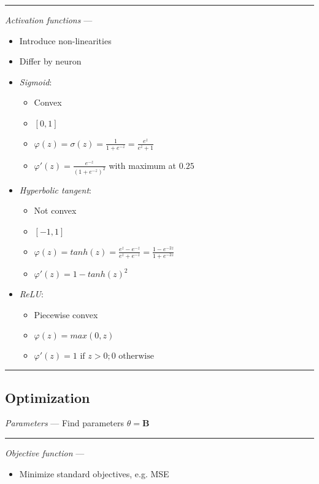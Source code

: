 {\color{lightgray}\hrule height 0.001mm}

\emph{Activation functions} --- 
\begin{itemize}
    \item Introduce non-linearities
    \item Differ by neuron
    \item \emph{Sigmoid}:
    \begin{itemize}
        \item Convex
        \item $[0,1]$
        \item $\varphi(z) = \sigma(z) =  \frac{1}{1+e^{-z}} = \frac{e^z}{e^z + 1}$
        \item $\varphi'(z) = \frac{e^{-z}}{(1+e^{-z})^2}$ with maximum at $0.25$
    \end{itemize}
    \item \emph{Hyperbolic tangent}:
    \begin{itemize}
        \item Not convex
        \item $[-1,1]$
        \item $\varphi(z) = tanh(z) =  \frac{e^z - e^{-z}}{e^z + e^{-z}} = \frac{1 - e^{-2z}}{1 + e^{-2z}}$
        \item $\varphi'(z) = 1-tanh(z)^2$
    \end{itemize}
    \item \emph{ReLU}:
    \begin{itemize}
        \item Piecewise convex
        \item $\varphi(z) = max(0,z)$
        \item $\varphi'(z) = 1 \textrm{ if } z > 0; 0 \textrm { otherwise}$
    \end{itemize}
\end{itemize}

{\color{black}\hrule height 0.001mm}

\subsection*{Optimization}
\emph{Parameters} --- Find parameters $\theta = \boldsymbol{B}$

{\color{lightgray}\hrule height 0.001mm}

\emph{Objective function} --- 
\begin{itemize}
    \item Minimize standard objectives, e.g. MSE
\end{itemize}

